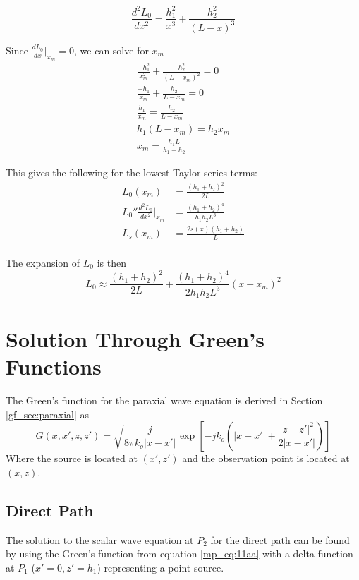 \begin{equation}
\frac{d^2L_0}{dx^2} = \frac{h_1^2}{x^3} + \frac{h_2^2}{(L-x)^3} 
\label{mp_eq:16}
\end{equation}

Since $\frac{dL_0}{dx}\big|_{x_m} = 0$, we can solve for $x_m$
\begin{equation}
\begin{gathered}
\frac{-h_1^2}{x_m^2} + \frac{h_2^2}{(L-x_m)^2} = 0\\
\frac{-h_1}{x_m} + \frac{h_2}{L-x_m} = 0\\
\frac{h_1}{x_m} = \frac{h_2}{L-x_m}\\
h_1(L-x_m) = h_2x_m\\
x_m = \frac{h_1L}{h_1+h_2}
\end{gathered}
\label{mp_eq:17}
\end{equation}

This gives the following for the lowest Taylor series terms:
\begin{equation}
\begin{aligned}
L_0(x_m) &= \frac{(h_1+h_2)^2}{2L} \\
L_0''\frac{d^2L_0}{dx^2}\bigg|_{x_m}  &= \frac{(h_1+h_2)^4}{h_1h_2L^3} \\
L_s(x_m) &= \frac{2s(x)(h_1 + h_2)}{L}\\
\end{aligned}
\label{mp_eq:17a}
\end{equation}

The expansion of $L_0$ is then
\begin{equation}
L_0 \approx \frac{(h_1+h_2)^2}{2L} + \frac{(h_1+h_2)^4}{2h_1h_2L^3}(x-x_m)^2
\label{mp_eq:18}
\end{equation}

\section{Solution Through Green's Functions}
The Green's function for the paraxial wave equation is derived in Section \ref{gf_sec:paraxial} as
\begin{equation}
G\left(x,x',z,z' \right)= \sqrt{\frac{j}{8\pi k_o|x-x'|}}\exp\left[-jk_o\left(|x -x'| + \frac{|z-z'|^2}{2|x-x'|}\right) \right]
\label{mp_eq:11aa}
\end{equation}
\renewcommand{\baselinestretch}{2} \small\normalsize
Where the source is located at $(x',z')$ and the observation point is located at $(x,z)$.

\subsection{Direct Path}
The solution to the scalar wave equation at $P_2$ for the direct path can be found by using the Green's function from equation \ref{mp_eq:11aa} with a delta function at $P_1$ ($x' = 0, z' = h_1$) representing a point source.

